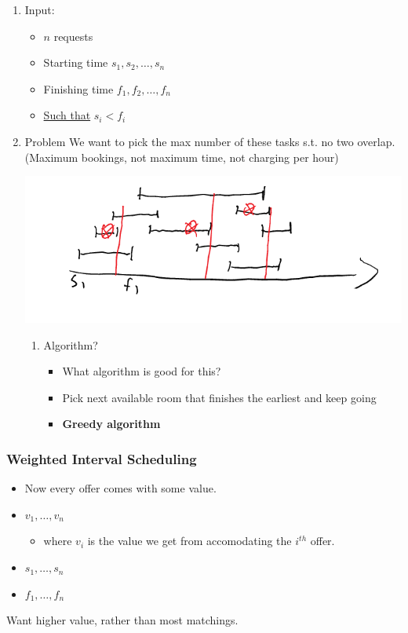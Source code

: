 \documentclass[11pt]{article}
\begin{document}
\begin{enumerate}
\item Input:
\label{sec:org21a39b7}
\begin{itemize}
\item \(n\) requests
\item Starting time \(s_1, s_2, \ldots , s_n\)
\item Finishing time \(f_1, f_2, \ldots, f_n\)
\item \uline{Such that} \(s_i<f_i\)
\end{itemize}

\item Problem
\label{sec:orgf7114b1}
We want to pick the max number of these tasks s.t. no two overlap. (Maximum bookings, not maximum time, not charging per hour)
\begin{center}
\includegraphics[width=.9\linewidth]{./Images/i2.png}
\end{center}
\begin{enumerate}
\item Algorithm?
\label{sec:org879473a}
\begin{itemize}
\item What algorithm is good for this?
\item Pick next available room that finishes the earliest and keep going
\item \textbf{Greedy algorithm}
\end{itemize}
\end{enumerate}
\end{enumerate}
\subsubsection{Weighted Interval Scheduling}
\label{sec:orgb838197}
\begin{itemize}
\item Now every offer comes with some value.
\item \(v_1,\ldots,v_n\)
\begin{itemize}
\item where \(v_i\) is the value we get from accomodating the \(i^{th}\) offer.
\end{itemize}
\item \(s_1,\ldots,s_n\)
\item \(f_1,\ldots,f_n\)
\end{itemize}
Want higher value, rather than most matchings.
\end{document}
